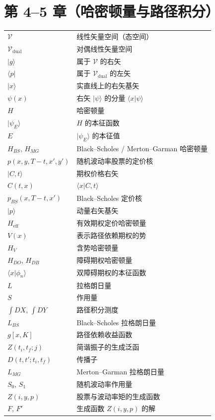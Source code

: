 \section*{第 4--5 章（哈密顿量与路径积分）}

\begin{center}
\begin{tabular}{@{}L{3.2cm}L{10.6cm}@{}}
\toprule
$\mathcal{V}$ & 线性矢量空间（态空间） \\
$\mathcal{V}_{\mathrm{dual}}$ & 对偶线性矢量空间 \\
$\vert g\rangle$ & 属于 $\mathcal{V}$ 的右矢 \\
$\langle p\vert$ & 属于 $\mathcal{V}_{\mathrm{dual}}$ 的左矢 \\
$\vert x\rangle$ & 实直线上的右矢基矢 \\
$\psi(x)$ & 右矢 $\vert\psi\rangle$ 的分量 $\langle x\vert\psi\rangle$ \\
$H$ & 哈密顿量 \\
$\vert\psi_E\rangle$ & $H$ 的本征函数 \\
$E$ & $\vert\psi_E\rangle$ 的本征值 \\
$H_{BS}$, $H_{MG}$ & Black--Scholes / Merton--Garman 哈密顿量 \\
$p(x,y,T-t,x',y')$ & 随机波动率股票的定价核 \\
$\vert C,t\rangle$ & 期权价格右矢 \\
$C(t,x)$ & $\langle x\vert C,t\rangle$ \\
$p_{BS}(x,T-t,x')$ & Black--Scholes 定价核 \\
$\vert p\rangle$ & 动量右矢基矢 \\
$H_{\mathrm{eff}}$ & 有效期权定价哈密顿量 \\
$V(x)$ & 表示路径依赖期权的势 \\
$H_V$ & 含势哈密顿量 \\
$H_{DO}$, $H_{DB}$ & 障碍期权哈密顿量 \\
$\langle x\vert\phi_n\rangle$ & 双障碍期权的本征函数 \\
\midrule
$L$ & 拉格朗日量 \\
$S$ & 作用量 \\
$\int DX$, $\int DY$ & 路径积分测度 \\
$L_{BS}$ & Black--Scholes 拉格朗日量 \\
$g[x,K]$ & 路径依赖收益函数 \\
$Z(t_i,t_f;j)$ & 简谐振子的生成泛函 \\
$D(t,t';t_i,t_f)$ & 传播子 \\
$L_{MG}$ & Merton--Garman 拉格朗日量 \\
$S_0$, $S_1$ & 随机波动率作用量 \\
$Z(i,y,p)$ & 股票与波动率矩的生成函数 \\
$F$, $F'$ & 生成函数 $Z(i,y,p)$ 的解 \\
\bottomrule
\end{tabular}
\end{center}

